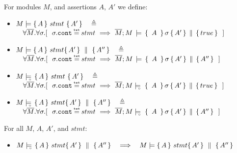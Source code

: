  \begin{definition}
For modules $M$, and assertions $A$, $A'$   we define:
\begin{itemize}
\item
\label{def:hoare:sem:one}
$M \models   \{\, A \,  \}\ stmt\  \{\, A' \, \}\ \ \ \triangleq$\\
{$\strut  \ \ \ \forall    \Mtwo. \forall  \sigma.[ \ \   %
 \sigma.\prg{cont}\txteq stmt\   \Longrightarrow \ 
{\satAssertQuadruple  \Mtwo  M   {\  A\ }  \sigma  { A'  } {true} } \ \ ]$%
}
 \item
 \label{def:hoare:sem:two}
$M \models  \{\, A \, \}\ stmt \{\, A' \, \} \, \,\parallel\,\, \{\, A'' \, \}   \ \ \  \triangleq$ \\
{$\strut  \ \ \  \forall    \Mtwo. \forall  \sigma.[ \  \  \sigma.\prg{cont}\txteq stmt\   \Longrightarrow \ 
{\satAssertQuadruple  \Mtwo  M    {\  A\ }  \sigma  { A'  } {A''} } \ \ ]$%
}
\item
\label{def:hoare:sem:three}
$M \models\!\!\!\!_{_{\circ}}\    \{\, A \,  \}\ stmt\  \{\, A' \, \}  \ \ \ \triangleq$\\
{$\strut  \ \ \ \forall    \Mtwo. \forall  \sigma.[ \ \   %
 \sigma.\prg{cont}\txteq stmt\   \Longrightarrow \ 
{\satDAssertQuadrupleFrom \Mtwo  M  \sigma   {\  A\ } { A'  } {true} } \ \ ]$%
}
 
 \item
 \label{def:hoare:sem:four}
$M \models\!\!\!\!_{_{\circ}}\   \{\, A \, \}\ stmt \{\, A' \, \} \, \,\parallel\,\, \{\, A'' \, \}    \ \ \  \triangleq$ \\
{$\strut  \ \ \  \forall    \Mtwo. \forall  \sigma.[ \ \    \sigma.\prg{cont}\txteq stmt\   \Longrightarrow \ 
{\satDAssertQuadrupleFrom \Mtwo  M  \sigma   {\  A\ } { A'  } {A''} } \ \ ]$%
}

\end{itemize}
\end{definition}



 
 \begin{lemma}
For all $M$, $A$, $A'$, and $stmt$:
\begin{itemize}
\item
$M \models\!\!\!\!_{_{\circ}}\   \{\, A \, \}\ stmt \{\, A' \, \} \, \,\parallel\,\, \{\, A'' \, \}     \ \ \ \Longrightarrow \ \ \ M \models  \{\, A \, \}\ stmt \{\, A' \, \} \, \,\parallel\,\, \{\, A'' \, \}  $
\end{itemize}
\end{lemma}
 

